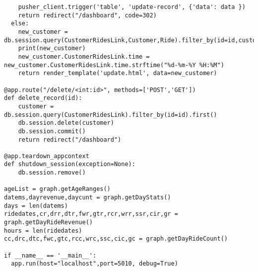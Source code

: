 \begin{verbatim}
    pusher_client.trigger('table', 'update-record', {'data': data })
    return redirect("/dashboard", code=302)
  else:
    new_customer = db.session.query(CustomerRidesLink,Customer,Ride).filter_by(id=id,customerId=Customer.id,rideId=Ride.id).first()
    print(new_customer)
    new_customer.CustomerRidesLink.time = new_customer.CustomerRidesLink.time.strftime("%d-%m-%Y %H:%M")
    return render_template('update.html', data=new_customer)

@app.route("/delete/<int:id>", methods=['POST','GET'])
def delete_record(id):
    customer = db.session.query(CustomerRidesLink).filter_by(id=id).first()
    db.session.delete(customer)
    db.session.commit()
    return redirect("/dashboard")

@app.teardown_appcontext
def shutdown_session(exception=None):
    db.session.remove()

ageList = graph.getAgeRanges()
datems,dayrevenue,daycunt = graph.getDayStats()
days = len(datems)
ridedates,cr,drr,dtr,fwr,gtr,rcr,wrr,ssr,cir,gr = graph.getDayRideRevenue()
hours = len(ridedates)
cc,drc,dtc,fwc,gtc,rcc,wrc,ssc,cic,gc = graph.getDayRideCount()

if __name__ == '__main__':
  app.run(host="localhost",port=5010, debug=True)
\end{verbatim}

